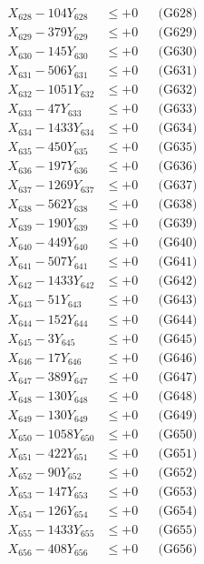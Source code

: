 \documentclass[a4paper,10pt]{article}
\begin{document}
{\begin{align}
X_{628} - 104Y_{628} &\leq +0 && \text{(G628)} \\
X_{629} - 379Y_{629} &\leq +0 && \text{(G629)} \\
X_{630} - 145Y_{630} &\leq +0 && \text{(G630)} \\
\allowbreak
X_{631} - 506Y_{631} &\leq +0 && \text{(G631)} \\
X_{632} - 1051Y_{632} &\leq +0 && \text{(G632)} \\
X_{633} - 47Y_{633} &\leq +0 && \text{(G633)} \\
X_{634} - 1433Y_{634} &\leq +0 && \text{(G634)} \\
X_{635} - 450Y_{635} &\leq +0 && \text{(G635)} \\
X_{636} - 197Y_{636} &\leq +0 && \text{(G636)} \\
X_{637} - 1269Y_{637} &\leq +0 && \text{(G637)} \\
X_{638} - 562Y_{638} &\leq +0 && \text{(G638)} \\
X_{639} - 190Y_{639} &\leq +0 && \text{(G639)} \\
X_{640} - 449Y_{640} &\leq +0 && \text{(G640)} \\
\allowbreak
X_{641} - 507Y_{641} &\leq +0 && \text{(G641)} \\
X_{642} - 1433Y_{642} &\leq +0 && \text{(G642)} \\
X_{643} - 51Y_{643} &\leq +0 && \text{(G643)} \\
X_{644} - 152Y_{644} &\leq +0 && \text{(G644)} \\
X_{645} - 3Y_{645} &\leq +0 && \text{(G645)} \\
X_{646} - 17Y_{646} &\leq +0 && \text{(G646)} \\
X_{647} - 389Y_{647} &\leq +0 && \text{(G647)} \\
X_{648} - 130Y_{648} &\leq +0 && \text{(G648)} \\
X_{649} - 130Y_{649} &\leq +0 && \text{(G649)} \\
X_{650} - 1058Y_{650} &\leq +0 && \text{(G650)} \\
\allowbreak
X_{651} - 422Y_{651} &\leq +0 && \text{(G651)} \\
X_{652} - 90Y_{652} &\leq +0 && \text{(G652)} \\
X_{653} - 147Y_{653} &\leq +0 && \text{(G653)} \\
X_{654} - 126Y_{654} &\leq +0 && \text{(G654)} \\
X_{655} - 1433Y_{655} &\leq +0 && \text{(G655)} \\
X_{656} - 408Y_{656} &\leq +0 && \text{(G656)} \\

\end{align}}
\end{document}
